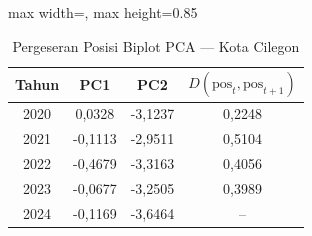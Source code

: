 \begin{table}[H]
\centering
\caption{Pergeseran Posisi Biplot PCA --- Kota Cilegon} \label{tab:appjarak_pca_skor_kota_cilegon}
\begin{adjustbox}{max width=\textwidth, max height=0.85\textheight}
\begin{tabular}{|c|c|c|c|}
\hline
\textbf{Tahun} & \textbf{PC1} & \textbf{PC2} & \textbf{$D(\text{pos}_t, \text{pos}_{t+1})$} \\
\hline
2020 & 0,0328 & -3,1237 & 0,2248 \\
2021 & -0,1113 & -2,9511 & 0,5104 \\
2022 & -0,4679 & -3,3163 & 0,4056 \\
2023 & -0,0677 & -3,2505 & 0,3989 \\
2024 & -0,1169 & -3,6464 & -- \\
\hline
\end{tabular}
\end{adjustbox}
\end{table}